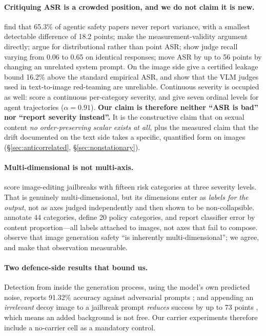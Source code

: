 \documentclass[11pt]{article}
\begin{document}
\paragraph{Critiquing ASR is a crowded position, and we do not claim it is new.}
\citet{asrisnotanumber} find that 65.3\% of agentic safety papers never report
variance, with a smallest detectable difference of 18.2 points;
\citet{comparisonrequires} make the measurement-validity argument directly;
\citet{singleconfig} argue for distributional rather than point ASR;
\citet{judgecalib} show judge recall varying from 0.06 to 0.65 on identical
responses; \citet{operationalstates} move ASR by up to 56 points by changing an
unrelated system prompt. On the image side \citet{certifyingunlearning} give a
certified leakage bound 16.2\% above the standard empirical ASR, and
\citet{rise} show that the VLM judges used in text-to-image red-teaming are
unreliable. Continuous severity is occupied as well: \citet{past2harm} score a
continuous per-category severity, and \citet{actiongraded} give seven ordinal
levels for agent trajectories ($\alpha=0.91$). \textbf{Our claim is therefore
neither ``ASR is bad'' nor ``report severity instead''.} It is the constructive
claim that on sexual content \emph{no order-preserving scalar exists at all},
plus the measured claim that the drift documented on the text side takes a
specific, quantified form on images (\S\ref{sec:anticorrelated},
\S\ref{sec:nonstationary}).

\paragraph{Multi-dimensional is not multi-axis.} \citet{visualjailbreak} score
image-editing jailbreaks with fifteen risk categories at three severity levels.
That is genuinely multi-dimensional, but its dimensions enter as \emph{labels for
the output}, not as axes judged independently and then shown to be
non-collapsible. \citet{t2isafety} annotate 44 categories, \citet{t2irisky}
define 20 policy categories, and \citet{redteamingnsfw} report classifier error
by content proportion---all labels attached to images, not axes that fail to
compose. \citet{safetyreport} observe that image generation safety ``is
inherently multi-dimensional''; we agree, and make that observation measurable.

\paragraph{Two defence-side results that bound us.} Detection from inside the
generation process, using the model's own predicted noise, reports 91.32\%
accuracy against adversarial prompts \citep{igndetector,unindm}; and appending an
\emph{irrelevant} decoy image to a jailbreak prompt \emph{reduces} success by up
to 73 points \citep{decoydrops}, which means an added background is not free. Our
carrier experiments therefore include a no-carrier cell as a mandatory control.
\end{document}
